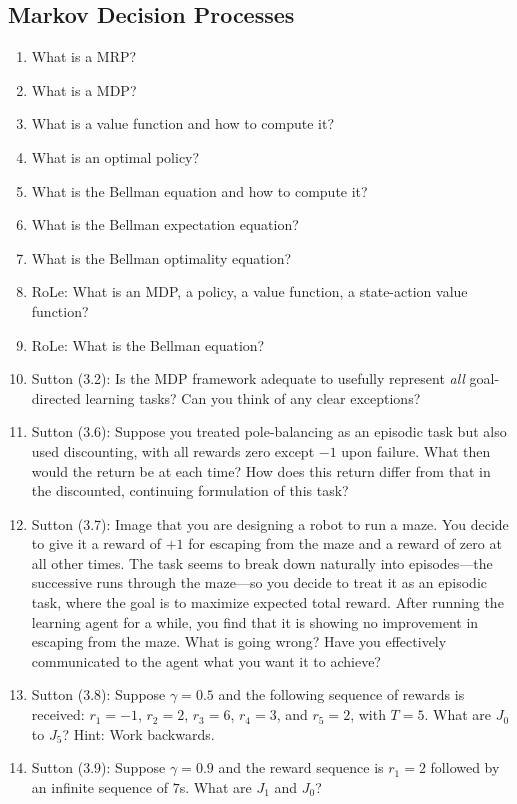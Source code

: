 		\subsection{Markov Decision Processes}
			\begin{enumerate}
				\item What is a \ac{MRP}?
				\item What is a \ac{MDP}?
				\item What is a value function and how to compute it?
				\item What is an optimal policy?
				\item What is the Bellman equation and how to compute it?
				\item What is the Bellman expectation equation?
				\item What is the Bellman optimality equation?
				\item RoLe: What is an \ac{MDP}, a policy, a value function, a state-action value function?
				\item RoLe: What is the Bellman equation?
				\item Sutton (3.2): Is the \ac{MDP} framework adequate to usefully represent \emph{all} goal-directed learning tasks? Can you think of any clear exceptions?
				\item Sutton (3.6): Suppose you treated pole-balancing as an episodic task but also used discounting, with all rewards zero except \(-1\) upon failure. What then would the return be at each time? How does this return differ from that in the discounted, continuing formulation of this task?
				\item Sutton (3.7): Image that you are designing a robot to run a maze. You decide to give it a reward of \(+1\) for escaping from the maze and a reward of zero at all other times. The task seems to break down naturally into episodes---the successive runs through the maze---so you decide to treat it as an episodic task, where the goal is to maximize expected total reward. After running the learning agent for a while, you find that it is showing no improvement in escaping from the maze. What is going wrong? Have you effectively communicated to the agent what you want it to achieve?
				\item Sutton (3.8): Suppose \(\gamma = 0.5\) and the following sequence of rewards is received: \( r_1 = -1 \), \( r_2 = 2 \), \( r_3 = 6 \), \( r_4 = 3 \), and \( r_5 = 2 \), with \( T = 5 \). What are \( J_0 \) to \( J_5 \)? Hint: Work backwards.
				\item Sutton (3.9): Suppose \(\gamma = 0.9\) and the reward sequence is \(r_1 = 2\) followed by an infinite sequence of \(7\)s. What are \(J_1\) and \(J_0\)?

\end{enumerate}
